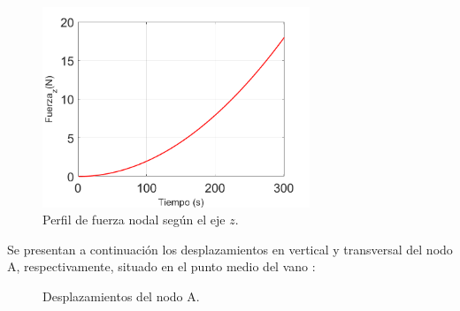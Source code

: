 \begin{figure}[h]
	\centering
	\includegraphics[width=80mm]{./imagenes/ResultadosNumericos/SimpleCable/FuerzaNodalZ_TLFoti.png}
	\caption{Perfil de fuerza nodal según el eje $z$.}
	\label{fig:RN:FotiCable:FuerzaZ}
\end{figure}



Se presentan a continuación los desplazamientos en vertical y transversal del nodo A, respectivamente, situado en el punto medio del vano :

\begingroup
\centering
\begin{figure}[htbp]
	\centering
	\caption{Desplazamientos del nodo A.} \label{fig:RN:FotiCable:DispsA}
\end{figure}
\endgroup

